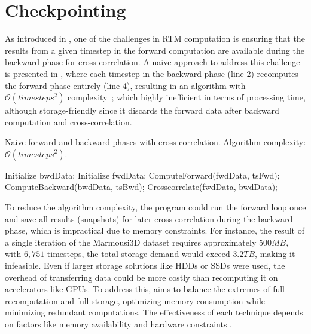 \documentclass[Ingles,Final]{ic-tese-v3}
\begin{document}
\section{Checkpointing}
\label{sec:chkpt}

As introduced in , one of the challenges in RTM computation is ensuring that the results from a given timestep in the forward computation are available during the backward phase for cross-correlation. A naive approach to address this challenge is presented in , where each timestep in the backward phase (line 2) recomputes the forward phase entirely (line 4), resulting in an algorithm with $\mathcal{O}(\textit{timesteps}^2)$ complexity~\cite{symes2007}; which highly inefficient in terms of processing time, although storage-friendly since it discards the forward data after backward computation and cross-correlation.

\begin{algorithm}[H]
\caption{Naive forward and backward phases with cross-correlation. Algorithm complexity: $\mathcal{O}(\textit{timesteps}^2)$.}
\label{alg:rtm_naive1}
\begin{algorithmic}[1]  %
\STATE Initialize bwdData;
    \STATE Initialize fwdData;
        \STATE ComputeForward(fwdData, tsFwd);
    \ENDFOR
    \STATE ComputeBackward(bwdData, tsBwd);
    \STATE Crosscorrelate(fwdData, bwdData);
\ENDFOR
\end{algorithmic}
\end{algorithm}

To reduce the algorithm complexity, the program could run the forward loop once and save all results (snapshots) for later cross-correlation during the backward phase, which is impractical due to memory constraints. For instance, the result of a single iteration of the Marmousi3D dataset requires approximately $500MB$, with $6,751$ timesteps, the total storage demand would exceed $3.2TB$, making it infeasible. Even if larger storage solutions like HDDs or SSDs were used, the overhead of transferring data could be more costly than recomputing it on accelerators like GPUs. To address this, \checkpointing aims to balance the extremes of full recomputation and full storage, optimizing memory consumption while minimizing redundant computations. The effectiveness of each technique depends on factors like memory availability and hardware constraints \cite{symes2007}.
\end{document}
